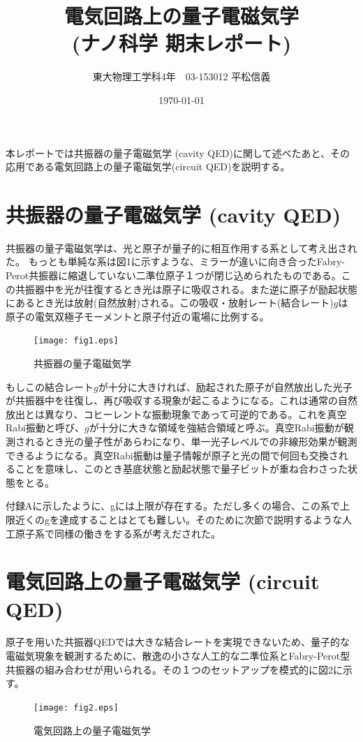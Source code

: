 \documentclass[11pt,a4paper]{jsarticle}
\title{電気回路上の量子電磁気学\\(ナノ科学 期末レポート)}
\author{東大物理工学科4年　03-153012 平松信義}
\date{\today}
\begin{document}
\maketitle
本レポートでは共振器の量子電磁気学 (cavity QED)に関して述べたあと、その応用である電気回路上の量子電磁気学(circuit QED)を説明する\cite{Schoelkopf}。

\section{共振器の量子電磁気学 (cavity QED)}
共振器の量子電磁気学は、光と原子が量子的に相互作用する系として考え出された。
もっとも単純な系は図1に示すような、ミラーが違いに向き合ったFabry-Perot共振器に縮退していない二準位原子１つが閉じ込められたものである。この共振器中を光が往復するとき光は原子に吸収される。また逆に原子が励起状態にあるとき光は放射(自然放射)される。この吸収・放射レート(結合レート)$g$は原子の電気双極子モーメントと原子付近の電場に比例する。
\begin{figure}[htb]
    \begin{center}
   \texttt{[image: fig1.eps]}
  \end{center}
  \caption{共振器の量子電磁気学}
\end{figure}

もしこの結合レート$g$が十分に大きければ、励起された原子が自然放出した光子が共振器中を往復し、再び吸収する現象が起こるようになる。これは通常の自然放出とは異なり、コヒーレントな振動現象であって可逆的である。これを真空Rabi振動と呼び、$g$が十分に大きな領域を強結合領域と呼ぶ。真空Rabi振動が観測されるとき光の量子性があらわになり、単一光子レベルでの非線形効果が観測できるようになる。真空Rabi振動は量子情報が原子と光の間で何回も交換されることを意味し、このとき基底状態と励起状態で量子ビットが重ね合わさった状態をとる。

付録Aに示したように、gには上限が存在する。ただし多くの場合、この系で上限近くのgを達成することはとても難しい。そのために次節で説明するような人工原子系で同様の働きをする系が考えだされた。

\section{電気回路上の量子電磁気学 (circuit QED)}
原子を用いた共振器QEDでは大きな結合レートを実現できないため、量子的な電磁気現象を観測するために、散逸の小さな人工的な二準位系とFabry-Perot型共振器の組み合わせが用いられる。その１つのセットアップを模式的に図2に示す。
\begin{figure}[htb]
    \begin{center}
   \texttt{[image: fig2.eps]}
  \end{center}
  \caption{電気回路上の量子電磁気学}
\end{figure}
\end{document}
